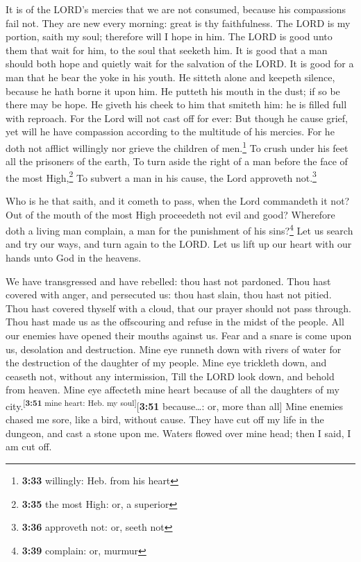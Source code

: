  It is of the LORD's mercies that we are not consumed,
because his compassions fail not.  They are new every
morning: great is thy faithfulness.  The LORD is my
portion, saith my soul; therefore will I hope in him. 
The LORD is good unto them that wait for him, to the soul that seeketh
him.  It is good that a man should both hope and quietly
wait for the salvation of the LORD.  It is good for a man
that he bear the yoke in his youth.  He sitteth alone and
keepeth silence, because he hath borne it upon him.  He
putteth his mouth in the dust; if so be there may be hope.
 He giveth his cheek to him that smiteth him: he is
filled full with reproach.  For the Lord will not cast
off for ever:  But though he cause grief, yet will he
have compassion according to the multitude of his mercies.
 For he doth not afflict willingly nor grieve the
children of men.\footnote{\textbf{3:33} willingly: Heb. from his heart}
 To crush under his feet all the prisoners of the earth,
 To turn aside the right of a man before the face of the
most High,\footnote{\textbf{3:35} the most High: or, a superior}
 To subvert a man in his cause, the Lord approveth
not.\footnote{\textbf{3:36} approveth not: or, seeth not}

 Who is he that saith, and it cometh to pass, when the
Lord commandeth it not?  Out of the mouth of the most
High proceedeth not evil and good?  Wherefore doth a
living man complain, a man for the punishment of his sins?\footnote{\textbf{3:39}
  complain: or, murmur}  Let us search and try our ways,
and turn again to the LORD.  Let us lift up our heart
with our hands unto God in the heavens.

 We have transgressed and have rebelled: thou hast not
pardoned.  Thou hast covered with anger, and persecuted
us: thou hast slain, thou hast not pitied.  Thou hast
covered thyself with a cloud, that our prayer should not pass through.
 Thou hast made us as the offscouring and refuse in the
midst of the people.  All our enemies have opened their
mouths against us.  Fear and a snare is come upon us,
desolation and destruction.  Mine eye runneth down with
rivers of water for the destruction of the daughter of my people.
 Mine eye trickleth down, and ceaseth not, without any
intermission,  Till the LORD look down, and behold from
heaven.  Mine eye affecteth mine heart because of all the
daughters of my city.\textsuperscript{{[}\textbf{3:51} mine heart: Heb.
my soul{]}}{[}\textbf{3:51} because\ldots: or, more than all{]}
 Mine enemies chased me sore, like a bird, without cause.
 They have cut off my life in the dungeon, and cast a
stone upon me.  Waters flowed over mine head; then I
said, I am cut off.

